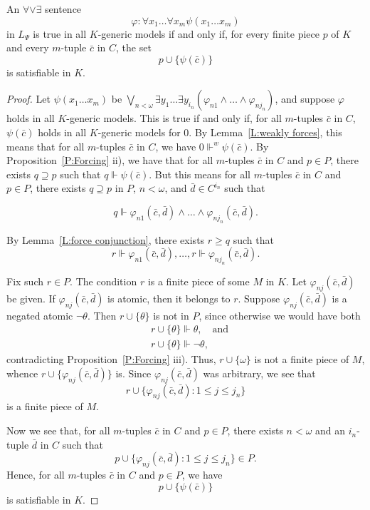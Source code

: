 \documentclass{scrartcl}
\renewcommand{\phi}{\varphi}
\newcommand{\aore}{\forall \vee \exists}
\begin{document}
\begin{theorem}
\label{T:for omitting}
An $\aore$ sentence
\[
\phi \colon \forall x_1\dots \forall x_m \psi(x_1\dots x_m)
\]
in $L_\Psi$ is true in all $K$-generic models if and only if, for every finite piece $p$ of $K$ and every $m$-tuple $\bar{c}$ in $C$, the set
\[
p\cup\{\psi(\bar{c})\}
\]
is satisfiable in $K$.
\end{theorem}

\begin{proof}

Let $\psi(x_1\dots x_m)$ be $\bigvee_{n< \omega} \exists y_1 \dots \exists y_{i_n} ( \phi_{n1}\wedge \dots \wedge \phi_{nj_n})$, and suppose $\phi$ holds in all $K$-generic models. This is true if and only if, for all $m$-tuples $\bar{c}$ in $C$, $\psi(\bar{c})$ holds in all $K$-generic models for $0$. By Lemma~\ref{L:weakly forces}, this means that for all $m$-tuples $\bar{c}$ in $C$, we have $0\Vdash ^w \psi (\bar{c})$. By Proposition~\ref{P:Forcing} ii), we have that for all $m$-tuples $\bar{c}$ in $C$ and $p\in P$, there exists $q\supseteq p$ such that $q\Vdash \psi(\bar{c})$. But this means for all $m$-tuples $\bar{c}$ in $C$ and $p\in P$, there exists $q \supseteq p$ in $P$, $n<\omega$, and $\bar{d} \in C^{i_n}$ such that

\[
q \Vdash \phi_{n1}(\bar{c},\bar{d}) \wedge \dots \wedge \phi_{nj_n}(\bar{c},\bar{d}).
\]

By Lemma~\ref{L:force conjunction}, there exists $r\ge q$ such that
\[
r \Vdash \phi_{n1}(\bar{c},\bar{d}) , \dots , r \Vdash \phi_{nj_n}(\bar{c},\bar{d}).
\]



Fix such $r\in P$. The condition $r$ is a finite piece of some $M$ in $K$. Let $\phi_{nj}(\bar{c},\bar{d})$ be given. If $\phi_{nj}(\bar{c},\bar{d})$ is atomic, then it belongs to $r$. Suppose $\phi_{nj}(\bar{c},\bar{d})$ is a negated atomic $\neg \theta$. Then $r \cup \{\theta\}$ is not in $P$, since otherwise we would have both
\begin{align*}
&r \cup \{\theta\} \Vdash \theta, \quad \text{and}\\
&r \cup \{\theta\} \Vdash \neg \theta,
\end{align*}
contradicting Proposition~\ref{P:Forcing} iii). Thus, $r\cup \{\omega\}$ is not a finite piece of $M$, whence $r\cup \{ \phi_{nj}(\bar{c},\bar{d}) \}$ is. Since $\phi_{nj}(\bar{c},\bar{d})$ was arbitrary, we see that
\[
r\cup \{ \phi_{nj}(\bar{c},\bar{d}) \colon 1\le j\le j_n \}
\]
is a finite piece of $M$.

Now we see that, for all $m$-tuples $\bar{c}$ in $C$ and $p\in P$, there exists $n < \omega$ and an $i_n$-tuple $\bar{d}$ in $C$ such that
\[
p\cup \{ \phi_{nj}(\bar{c},\bar{d}) \colon 1\le j\le j_n \} \in P.
\]
Hence, for all $m$-tuples $\bar{c}$ in $C$ and $p\in P$, we have
\[
p\cup \{ \psi(\bar{c}) \}
\]
is satisfiable in $K$.
\end{proof}
\end{document}

